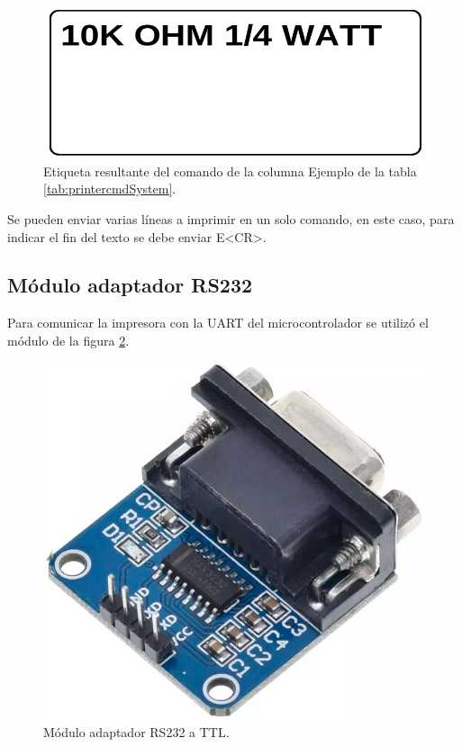 \begin{figure}[htpb]
	\centering
	\includegraphics[scale=0.3]{./Figures/label_ej.png}
	\caption{Etiqueta resultante del comando de la columna Ejemplo de la tabla \ref{tab:printercmdSystem}.}
	\label{fig:label_ej}
\end{figure}

Se pueden enviar varias líneas a imprimir en un solo comando, en este caso, para indicar el fin del texto se debe enviar E\textless{}CR\textgreater.

\subsection{Módulo adaptador RS232}
\label{subsec:Mod232}
Para comunicar la impresora con la UART del microcontrolador se utilizó el módulo de la figura \ref{fig:rs232}. 

\begin{figure}[hb]
	\centering
	\includegraphics[scale=0.25]{./Figures/rs3232.png}
	\caption{Módulo adaptador RS232 a TTL.}
	\label{fig:rs232}
\end{figure}

